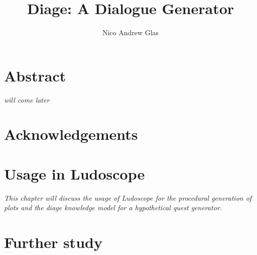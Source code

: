 \documentclass[12pt,a4paper,onecolumn,titlepage]{book}
\author{Nico Andrew Glas}
\title{Diage: A Dialogue Generator}
\begin{document}
\maketitle
\chapter*{Abstract}
\textit{will come later}\cite{Cavazza:2002:CIS:630325.630747} \cite{Greimas:Boydstun:90} \cite{Magerko:2004:ACD:1597321.1597339} \cite{Porteous:2009:CNG:1695522.1695557} \cite{Weyhrauch:1997:GID:925491} \cite{Riedl03character-focusednarrative} \cite{Riedl:2003:MIU:860575.860694} \cite{Riedl:2004:IPM:1018409.1018753} \cite{Sgouros199929}

\chapter*{Acknowledgements}
\tableofcontents






\chapter{Usage in Ludoscope}
\label{sec:ludoscope}
\textit{This chapter will discuss the usage of Ludoscope for the procedural generation of plots and the diage knowledge model for a hypothetical quest generator.}
\chapter{Further study}
\label{sec:further_study}


\end{document}
